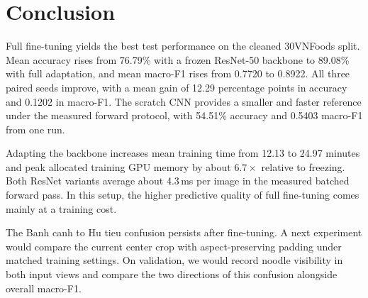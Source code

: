 \section{Conclusion}
\label{sec:a2-conclusion}

Full fine-tuning yields the best test performance on the cleaned 30VNFoods split. Mean accuracy rises from 76.79\% with a frozen ResNet-50 backbone to 89.08\% with full adaptation, and mean macro-F1 rises from 0.7720 to 0.8922. All three paired seeds improve, with a mean gain of 12.29 percentage points in accuracy and 0.1202 in macro-F1. The scratch CNN provides a smaller and faster reference under the measured forward protocol, with 54.51\% accuracy and 0.5403 macro-F1 from one run.

Adapting the backbone increases mean training time from 12.13 to 24.97 minutes and peak allocated training GPU memory by about $6.7\times$ relative to freezing. Both ResNet variants average about 4.3\,ms per image in the measured batched forward pass. In this setup, the higher predictive quality of full fine-tuning comes mainly at a training cost.

The Banh canh to Hu tieu confusion persists after fine-tuning. A next experiment would compare the current center crop with aspect-preserving padding under matched training settings. On validation, we would record noodle visibility in both input views and compare the two directions of this confusion alongside overall macro-F1.
\clearpage
